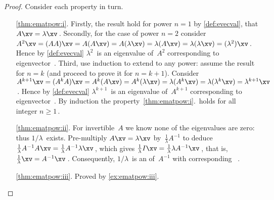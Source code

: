 \begin{proof} 
Consider each property in turn.
\begin{itemize}
\item[\ref{thm:ematpow:i}.]  
Firstly, the result hold for power \(n=1\) by \autoref{def:evecval}, that \(A\xv=\lambda\xv\)\,.
Secondly, for the case of power \(n=2\)  consider \(A^2\xv=(AA)\xv=A(A\xv)=A(\lambda\xv)=\lambda(A\xv)=\lambda(\lambda\xv)=(\lambda^2)\xv\)\,.  
Hence by \autoref{def:evecval} \(\lambda^2\)~is an eigenvalue of~\(A^2\) corresponding to eigenvector~\xv.
Third, use induction to extend to any power: assume the result for \(n=k\) (and proceed to prove it for \(n=k+1\)).
Consider \(A^{k+1}\xv=(A^kA)\xv=A^k(A\xv)=A^k(\lambda\xv)=\lambda(A^k\xv)=\lambda(\lambda^k\xv)=\lambda^{k+1}\xv\)\,.
Hence by \autoref{def:evecval} \(\lambda^{k+1}\)~is an eigenvalue of~\(A^{k+1}\) corresponding to eigenvector~\xv.
By induction the property~\ref{thm:ematpow:i}.\ holds for all integer \(n\geq1\)\,.

\item[\ref{thm:ematpow:ii}.]  
For invertible~\(A\) we know none of the eigenvalues are zero: thus \(1/\lambda\)~exists.
Pre-multiply \(A\xv=\lambda\xv\) by~\(\frac1\lambda A^{-1}\) to deduce
\(\frac1\lambda A^{-1}A\xv=\frac1\lambda A^{-1}\lambda\xv\)\,, which gives \(\frac1\lambda I\xv=\frac1\lambda \lambda A^{-1}\xv\)\,, that is, \(\frac1\lambda\xv= A^{-1}\xv\)\,.  
Consequently, \(1/\lambda\)~is an  of~\(A^{-1}\) with corresponding ~\xv.

\item[\ref{thm:ematpow:iii}.] Proved by \autoref{ex:ematpow:iii}.  
\end{itemize}
\end{proof}




